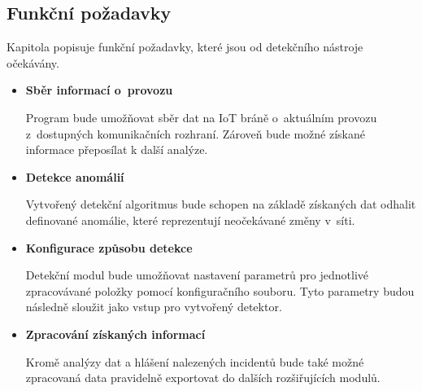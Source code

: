   \subsection{Funkční požadavky}
  Kapitola popisuje funkční požadavky, které jsou od detekčního nástroje očekávány.
  \begin{itemize}
   \item \textbf{Sběr informací o~provozu}
   
   Program bude umožňovat sběr dat na IoT bráně o~aktuálním provozu z~dostupných komunikačních
   rozhraní. Zároveň bude možné získané informace přeposílat k další analýze.
   
   \item \textbf{Detekce anomálií}
   
   Vytvořený detekční algoritmus bude schopen na základě získaných dat odhalit definované anomálie,
   které reprezentují neočekávané změny v~síti. 
   
   \item \textbf{Konfigurace způsobu detekce}
   
   Detekční modul bude umožňovat nastavení parametrů pro jednotlivé zpracovávané položky
   pomocí konfiguračního souboru. Tyto 
   parametry budou následně sloužit jako vstup pro vytvořený detektor.
   
   \item \textbf{Zpracování získaných informací}
   
   Kromě analýzy dat a hlášení nalezených incidentů bude také možné zpracovaná data pravidelně 
   exportovat do dalších rozšiřujících modulů.
  \end{itemize}

